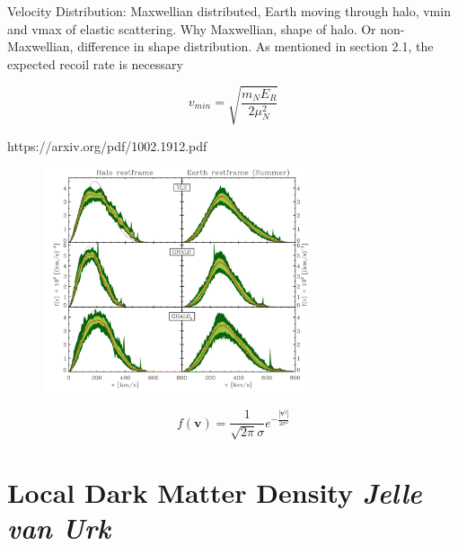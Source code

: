 \documentclass{article}
\begin{document}
Velocity Distribution:
Maxwellian distributed, Earth moving through halo, vmin and vmax of elastic scattering. \cite{Kavanagh:2014rya} Why Maxwellian, shape of halo. 
Or non-Maxwellian, difference in shape distribution. 
As mentioned in section 2.1, the expected recoil rate is necessary 

\begin{equation}
    v_{min} = \sqrt{\frac{m_{N}E_{R}}{2\mu^{2}_{N}}}
\end{equation}

https://arxiv.org/pdf/1002.1912.pdf
\begin{figure}[h]
    \centering
    \includegraphics[width=0.7\textwidth]{Vel-dist.png}
    \caption{}
\end{figure}


\begin{equation}
    f(\textbf{v}) = \frac{1}{\sqrt{2\pi}\sigma}e^{-\frac{|\textbf{v}^{2}|}{2\sigma^{2}}}
\end{equation}

\section{Local Dark Matter Density \small{\textit{Jelle van Urk}}} \label{Local_DM_Density}
\end{document}

